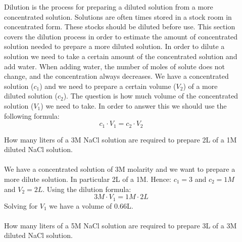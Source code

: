 \documentclass[main.tex]{subfiles}
\begin{document}
\begin{description}
\item[] Dilution is the process for preparing a diluted solution from a more concentrated solution. Solutions are often times stored in a stock room in concentrated form. These stocks should be diluted before use. This section covers the dilution process in order to estimate the amount of concentrated solution needed to prepare a more diluted solution. In order to dilute a solution we need to take a certain amount of the concentrated solution and add water. When adding water, the number of moles of solute does not change, and the concentration always decreases. We have a concentrated solution ($c_1$) and we need to prepare a certain volume ($V_2$) of a more diluted solution ($c_2$). The question is how much volume of the concentrated solution ($V_1$) we need to take. In order to answer this we should use the following formula:
 \begin{equation*}
\boxed{ c_1\cdot V_1=c_2\cdot V_2 }   
\end{equation*}

\begin{example} %
How many liters of a 3M NaCl solution are required to prepare 2L of a 1M diluted NaCl solution.
\\
\\
We have a concentrated solution of 3M molarity and we want to prepare a more dilute solution. In particular 2L of a 1M. Hence: $c_1=3$ and $c_2=1M$ and $V_2=2L$. Using the dilution formula:
 \begin{equation*}
 3M \cdot V_1=1M \cdot  2L 
\end{equation*}
Solving for $V_1$ we have a volume of 0.66L.
\\
\faDiamond\ \\
How many liters of a 5M NaCl solution are required to prepare 3L of a 3M diluted NaCl solution.
  \\
\end{example}%

\end{description}
\end{document}
